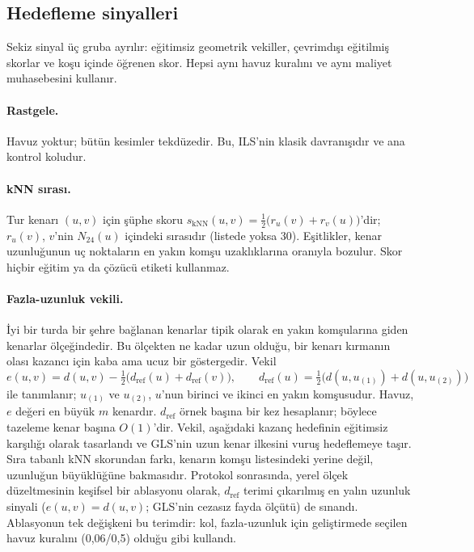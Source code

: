 \subsection{Hedefleme sinyalleri}\label{sec:yontem-sinyal}

Sekiz sinyal üç gruba ayrılır: eğitimsiz geometrik vekiller, çevrimdışı eğitilmiş skorlar ve koşu
içinde öğrenen skor. Hepsi aynı havuz kuralını ve aynı maliyet muhasebesini kullanır.

\paragraph{Rastgele.} Havuz yoktur; bütün kesimler tekdüzedir. Bu, ILS'nin klasik davranışıdır ve
ana kontrol koludur.

\paragraph{kNN sırası.} Tur kenarı $(u,v)$ için şüphe skoru
$s_{\mathrm{kNN}}(u,v)=\tfrac12\bigl(r_u(v)+r_v(u)\bigr)$'dir; $r_u(v)$, $v$'nin $N_{24}(u)$
içindeki sırasıdır (listede yoksa $30$). Eşitlikler, kenar uzunluğunun uç noktaların en yakın komşu
uzaklıklarına oranıyla bozulur. Skor hiçbir eğitim ya da çözücü etiketi kullanmaz.

\paragraph{Fazla-uzunluk vekili.} İyi bir turda bir şehre bağlanan kenarlar tipik olarak en yakın
komşularına giden kenarlar ölçeğindedir. Bu ölçekten ne kadar uzun olduğu, bir kenarı kırmanın
olası kazancı için kaba ama ucuz bir göstergedir. Vekil
\begin{equation}
  e(u,v)=d(u,v)-\tfrac12\bigl(d_{\mathrm{ref}}(u)+d_{\mathrm{ref}}(v)\bigr),\qquad
  d_{\mathrm{ref}}(u)=\tfrac12\bigl(d(u,u_{(1)})+d(u,u_{(2)})\bigr)
  \label{eq:excess}
\end{equation}
ile tanımlanır; $u_{(1)}$ ve $u_{(2)}$, $u$'nun birinci ve ikinci en yakın komşusudur. Havuz,
$e$ değeri en büyük $m$ kenardır. $d_{\mathrm{ref}}$ örnek başına bir kez hesaplanır; böylece
tazeleme kenar başına $O(1)$'dir. Vekil, aşağıdaki kazanç hedefinin eğitimsiz karşılığı olarak
tasarlandı ve GLS'nin uzun kenar ilkesini \citep{voudouris_1999_gls} vuruş hedeflemeye taşır. Sıra
tabanlı kNN skorundan farkı, kenarın komşu listesindeki yerine değil, uzunluğun büyüklüğüne
bakmasıdır. Protokol sonrasında, yerel ölçek düzeltmesinin keşifsel bir ablasyonu olarak,
$d_{\mathrm{ref}}$ terimi çıkarılmış en yalın uzunluk sinyali ($e(u,v)=d(u,v)$; GLS'nin cezasız
fayda ölçütü) de sınandı. Ablasyonun tek değişkeni bu terimdir: kol, fazla-uzunluk için
geliştirmede seçilen havuz kuralını (0,06/0,5) olduğu gibi kullandı.

